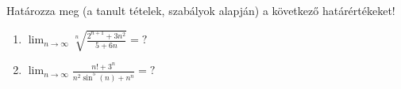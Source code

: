 \documentclass[11pt]{scrartcl}
\begin{document}
Határozza meg (a tanult tételek, szabályok alapján) a következő határértékeket!
\begin{enumerate}
	\item \(\displaystyle
	      \lim_{n \to \infty} \sqrt[n]{
		      \frac{2^{n + 1} + 3n^2}{5 + 6n}
	      } = ?
	      \)

	\item \(\displaystyle
	      \lim_{n \to \infty} \frac{
		      n! + 3^n
	      }{
		      n^2 \sin^5(n) + n^n
	      } = ?
	      \)
\end{enumerate}
\end{document}
